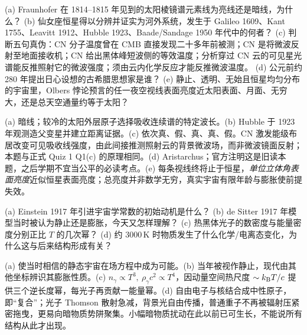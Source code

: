 \begin{exercise}
(a) Fraunhofer 在 1814--1815 年见到的太阳棱镜谱元素线为亮线还是暗线，为什么？
(b) 仙女座恒星得以分辨并证实为河外系统，发生于 Galileo 1609、Kant 1755、Leavitt 1912、Hubble 1923、Baade/Sandage 1950 年代中的何者？
(c) 判断五句真伪：CN 分子温度曾在 CMB 直接发现二十多年前被测；CN 是将微波反射至地面接收机；CN 给出黑体峰短波侧的等效温度；分析穿过 CN 云的可见星光谱能反推照射它的微波强度；须由云内化学反应才能反推微波温度。
(d) 公元前约 280 年提出日心设想的古希腊思想家是谁？
(e) 静止、透明、无始且恒星均匀分布的宇宙里，Olbers 悖论预言的任一夜空视线表面亮度近太阳表面、月面、无穷大，还是总天空通量约等于太阳？
\end{exercise}
\begin{solution}
(a) 暗线；较冷的太阳外层原子选择吸收连续谱的特定波长。(b) Hubble 于 1923 年观测造父变星并建立距离证据。(c) 依次真、假、真、真、假。CN 激发能级布居改变可见吸收线强度，由此间接推测照射云的背景微波场，而非微波镜面反射；本题与正式 Quiz 1 Q1(c) 的原理相同。(d) Aristarchus；官方注明这是旧读本题，之后学期不宜当公平的必读考点。(e) 每条视线终将止于恒星，\emph{单位立体角表面亮度}近似恒星表面亮度；总亮度并非数学无穷，真实宇宙有限年龄与膨胀使前提失效。
\end{solution}

\begin{exercise}
(a) Einstein 1917 年引进宇宙学常数的初始动机是什么？
(b) de Sitter 1917 年模型当时被认为静止还是膨胀，今天又怎样理解？
(c) 热黑体光子的数密度与能量密度分别正比 $T$ 的几次幂？
(d) 约 $3000\,\mathrm K$ 时物质发生了什么化学/电离态变化，为什么这与后来结构形成有关？
\end{exercise}
\begin{solution}
(a) 使当时相信的静态宇宙在场方程中成为可能。(b) 当年被视作静止，现代由其他坐标辨识其膨胀性质。(c) $n_\gamma\propto T^3,\ \rho_\gamma c^2\propto T^4$，因动量空间热尺度 $\sim k_{\mathrm B} T/c$ 提供三个逆长度幂，每光子再贡献一能量幂。(d) 自由电子与核结合成中性原子，即“复合”；光子 Thomson 散射急减，背景光自由传播，普通重子不再被辐射压紧密拖曳，更易向暗物质势阱聚集。小幅暗物质扰动在此以前已可生长，不能说所有结构从此才出现。
\end{solution}

